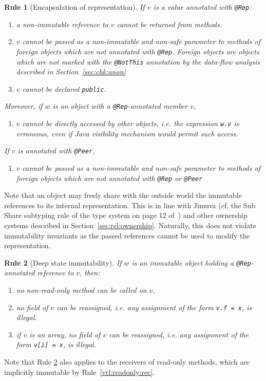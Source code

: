 \documentclass{pracamgr}
\theoremstyle{break}
\theoremstyle{break}
\theoremstyle{break}
\newtheorem{verrule}{Rule}
\begin{document}
\begin{verrule}[Encapsulation of representation]
  If $v$ is a value annotated with \texttt{@Rep}:
  \begin{enumerate}[label=(\arabic*)]
  \item a non-immutable reference to $v$ cannot be returned from
    methods.
  \item $v$ cannot be passed as a non-immutable and non-safe parameter
    to methods of foreign objects which are not annotated with
    \texttt{@Rep}. Foreign objects are objects which are not marked
    with the \texttt{@NotThis} annotation by the data-flow analysis
    described in Section~\ref{sec:chk:anon}
  \item $v$ cannot be declared \texttt{public}. 
  \end{enumerate}
  Moreover, if $w$ is an object with a \texttt{@Rep}-annotated member
  $v$,
  \begin{enumerate}[label=(\arabic*), resume]
  \item $v$ cannot be directly accessed by other objects, i.e. the
    expression \texttt{w.v} is erroneous, even if Java visibility
    mechanism would permit such access.
  \end{enumerate}
  If $v$ is annotated with \texttt{@Peer},
  \begin{enumerate}[label=(\arabic*), resume]
  \item $v$ cannot be passed as a non-immutable and non-safe parameter
    to methods of foreign objects which are not annotated with
    \texttt{@Rep} or \texttt{@Peer}
  \end{enumerate}
\end{verrule}

Note that an object may freely share with the outside world the
immutable references to its internal representation. This is in line
with Jimuva (cf. the Sub Share subtyping rule of the type system on
page 12 of~\cite{haack}) and other ownership systems described in
Section~\ref{sec:rel:ownership}. Naturally, this does not violate
immutability invariants as the passed references cannot be used to
modify the representation.

\begin{verrule}[Deep state immutability] \label{vrl:deepimm}
  If $w$ is an immutable object holding a \texttt{@Rep}-annotated
  reference to $v$, then:
  \begin{enumerate}[label=(\arabic*)]
  \item no non-read-only method can be called on $v$, 
  \item no field of $v$ can be reassigned, i.e. any assignment of the
    form \texttt{v.f~=~x}, is illegal.
  \item \label{pnt:deep-array} if $v$ is an array, no field of $v$ can
    be reassigned, i.e. any assignment of the form \texttt{v[i]~=~x},
    is illegal.
  \end{enumerate}
\end{verrule}
Note that Rule \ref{vrl:deepimm} also applies to the receivers of
read-only methods, which are implicitly immutable by
Rule~\ref{vrl:readonly:rec}. 
\end{document}
